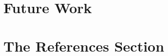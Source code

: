 \documentclass[runningheads,a4paper]{llncs}
\begin{document}
\section{Future Work}


\section{The References Section}\label{references}


\begin{thebibliography}{4}







\end{thebibliography}


\end{document}

